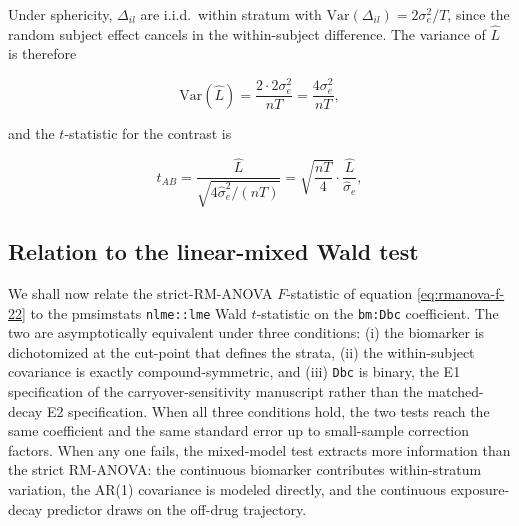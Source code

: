 \documentclass[
  11pt,
]{article}
\begin{document}
Under sphericity, \(\Delta_{il}\) are i.i.d.~within stratum with
\(\mathrm{Var}(\Delta_{il}) = 2\sigma_e^2 / T\), since the random
subject effect cancels in the within-subject difference. The
variance of \(\hat L\) is therefore

\begin{equation}
\mathrm{Var}(\hat L) = \frac{2 \cdot 2\sigma_e^2}{nT}
= \frac{4\sigma_e^2}{nT} ,
\label{eq:rmanova-varL}
\end{equation}

and the \(t\)-statistic for the contrast is

\begin{equation}
t_{AB} = \frac{\hat L}{\sqrt{4\hat\sigma_e^2 / (nT)}}
= \sqrt{\frac{nT}{4}} \cdot \frac{\hat L}{\hat\sigma_e},
\label{eq:rmanova-t}
\end{equation}

\subsection{Relation to the linear-mixed Wald test}\label{relation-to-the-linear-mixed-wald-test}

We shall now relate the strict-RM-ANOVA \(F\)-statistic of
equation \eqref{eq:rmanova-f-22} to the pmsimstats \texttt{nlme::lme}
Wald \(t\)-statistic on the \texttt{bm:Dbc} coefficient. The two are
asymptotically equivalent under three conditions: (i) the
biomarker is dichotomized at the cut-point that defines the
strata, (ii) the within-subject covariance is exactly
compound-symmetric, and (iii) \texttt{Dbc} is binary, the E1
specification of the carryover-sensitivity manuscript rather than
the matched-decay E2 specification. When all three conditions
hold, the two tests reach the same coefficient and the same
standard error up to small-sample correction factors. When any
one fails, the mixed-model test extracts more information than
the strict RM-ANOVA: the continuous biomarker contributes
within-stratum variation, the AR(1) covariance is modeled
directly, and the continuous exposure-decay predictor draws on
the off-drug trajectory.
\end{document}
